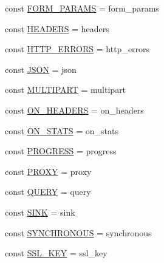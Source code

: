 \begin{DoxyCompactItemize}
\item 
const \hyperlink{classGuzzleHttp_1_1RequestOptions_a5e871b3bba396f3dc5489c802ec68733}{F\+O\+R\+M\+\_\+\+P\+A\+R\+A\+MS} = \textquotesingle{}form\+\_\+params\textquotesingle{}
\item 
const \hyperlink{classGuzzleHttp_1_1RequestOptions_a73db8d440c90d9e05d9fd77a890fa974}{H\+E\+A\+D\+E\+RS} = \textquotesingle{}headers\textquotesingle{}
\item 
const \hyperlink{classGuzzleHttp_1_1RequestOptions_a8df7862e071288b6a58f9795d65137eb}{H\+T\+T\+P\+\_\+\+E\+R\+R\+O\+RS} = \textquotesingle{}http\+\_\+errors\textquotesingle{}
\item 
const \hyperlink{classGuzzleHttp_1_1RequestOptions_a616e6ffe29f1640d5df6c5ff05cc7fa8}{J\+S\+ON} = \textquotesingle{}json\textquotesingle{}
\item 
const \hyperlink{classGuzzleHttp_1_1RequestOptions_a3e538b73894d7e42c7c73e65aa4a5b75}{M\+U\+L\+T\+I\+P\+A\+RT} = \textquotesingle{}multipart\textquotesingle{}
\item 
const \hyperlink{classGuzzleHttp_1_1RequestOptions_a85b62a6996bfbe075bec831640cf7849}{O\+N\+\_\+\+H\+E\+A\+D\+E\+RS} = \textquotesingle{}on\+\_\+headers\textquotesingle{}
\item 
const \hyperlink{classGuzzleHttp_1_1RequestOptions_a1e6b04bb69c562076265d624a43a01e1}{O\+N\+\_\+\+S\+T\+A\+TS} = \textquotesingle{}on\+\_\+stats\textquotesingle{}
\item 
const \hyperlink{classGuzzleHttp_1_1RequestOptions_a16c0d39481c4042fbe0461b4ce75288d}{P\+R\+O\+G\+R\+E\+SS} = \textquotesingle{}progress\textquotesingle{}
\item 
const \hyperlink{classGuzzleHttp_1_1RequestOptions_abf7e4c107ddcea50f32f39544c68f08a}{P\+R\+O\+XY} = \textquotesingle{}proxy\textquotesingle{}
\item 
const \hyperlink{classGuzzleHttp_1_1RequestOptions_a6a4f00a9a6a50daeaf4065ead825a228}{Q\+U\+E\+RY} = \textquotesingle{}query\textquotesingle{}
\item 
const \hyperlink{classGuzzleHttp_1_1RequestOptions_af4a4eb08329bb842ff51298041d972ae}{S\+I\+NK} = \textquotesingle{}sink\textquotesingle{}
\item 
const \hyperlink{classGuzzleHttp_1_1RequestOptions_adfd8f46ea8f924f73f15dbad7a46d351}{S\+Y\+N\+C\+H\+R\+O\+N\+O\+US} = \textquotesingle{}synchronous\textquotesingle{}
\item 
const \hyperlink{classGuzzleHttp_1_1RequestOptions_ad321b0701e6ccbe7008f508d534667c5}{S\+S\+L\+\_\+\+K\+EY} = \textquotesingle{}ssl\+\_\+key\textquotesingle{}

\end{DoxyCompactItemize}
